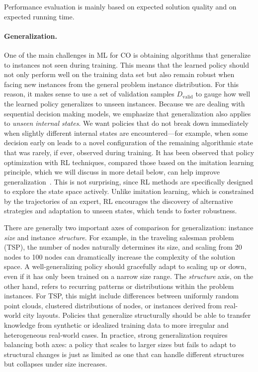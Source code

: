 \documentclass[a4paper]{report}
\theoremstyle{definition}
\theoremstyle{plain}
\newcommand\note[1]{{\color{Navy}#1}}
\begin{document}
\note{Performance evaluation is mainly based on expected solution quality and
  on expected running time.}

\paragraph{Generalization.}

One of the main challenges in ML for CO is obtaining algorithms that generalize
to instances not seen during training.
%
This means that the learned policy should not only perform well on the training
data set but also remain robust when facing new instances from the general
problem instance distribution.
%
For this reason, it makes sense to use a set of validation samples
$D_\text{valid}$ to gauge how well the learned policy generalizes to unseen
instances.
%
Because we are dealing with sequential decision making models, we emphasize that
generalization also applies to \emph{unseen internal states}.
%
We want policies that do not break down immediately when slightly different
internal states are encountered---for example, when some decision early on leads
to a novel configuration of the remaining algorithmic state that was rarely, if
ever, observed during training.
%
It has been observed that policy optimization with RL techniques, compared those
based on the imitation learning principle, which we will discuss in more detail
below, can help improve
generalization~\cite{belloNeuralCombinatorialOptimization2017}. This is not
surprising, since RL methods are specifically designed to explore the state
space actively.
%
Unlike imitation learning, which is constrained by the trajectories of an
expert, RL encourages the discovery of alternative strategies and adaptation to
unseen states, which tends to foster robustness.

There are generally two important axes of comparison for generalization:
instance \emph{size} and instance \emph{structure}.
%
For example, in the traveling salesman problem (TSP), the number of nodes
naturally determines its size, and scaling from 20 nodes to 100 nodes can
dramatically increase the complexity of the solution space. A well-generalizing
policy should gracefully adapt to scaling up or down, even if it has only been
trained on a narrow size range.
%
The \emph{structure} axis, on the other hand, refers to recurring patterns or
distributions within the problem instances. For TSP, this might include
differences between uniformly random point clouds, clustered distributions of
nodes, or instances derived from real-world city layouts. Policies that
generalize structurally should be able to transfer knowledge from synthetic or
idealized training data to more irregular and heterogeneous real-world cases.
%
In practice, strong generalization requires balancing both axes: a policy that
scales to larger sizes but fails to adapt to structural changes is just as
limited as one that can handle different structures but collapses under size
increases.
\end{document}
